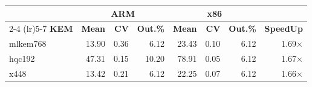 \begin{table}[!ht]
\begin{tabular}{lrrr|rrr|r}
 \toprule
& \multicolumn{3}{c}{\bfseries ARM} & \multicolumn{3}{c}{\bfseries x86} &\\
\cmidrule(lr){2-4} \cmidrule(lr){5-7}
\textbf{KEM} & \textbf{Mean} & \textbf{CV} & \textbf{Out.\%} & \textbf{Mean} & \textbf{CV} & \textbf{Out.\%} & \textbf{SpeedUp}\\
\midrule
mlkem768 & 13.90 & 0.36 & 6.12 & 23.43 & 0.10 & 6.12 & 1.69× \\
hqc192 & 47.31 & 0.15 & 10.20 & 78.91 & 0.05 & 6.12 & 1.67× \\
x448 & 13.42 & 0.21 & 6.12 & 22.25 & 0.07 & 6.12 & 1.66× \\
\bottomrule
\end{tabular}
\end{table}
